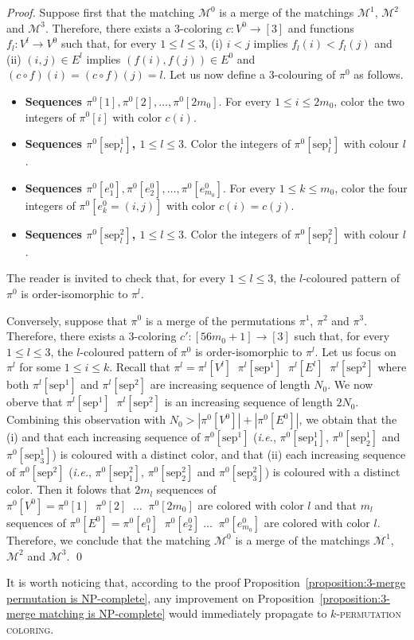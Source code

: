 \begin{proof}
  Suppose first 
  that the matching $\mathcal{M}^0$ is a merge of the matchings
  $\mathcal{M}^1$, $\mathcal{M}^2$ and $\mathcal{M}^3$.
  Therefore, there exists a $3$-coloring $c : V^0 \to [3]$
  and functions $f_l : V^l \to V^0$ such that, for every $1 \leq l \leq 3$,
  (i) $i < j$ implies $f_l(i) < f_l(j)$ and  
  (ii) $(i, j) \in E^l$ implies $(f(i), f(j)) \in E^0$ and $(c \circ f)(i) = (c \circ f)(j) = l$.
  Let us now define a $3$-colouring of $\pi^0$ as follows.
  \begin{itemize}
    \item \textbf{Sequences $\pi^0[1], \pi^0[2], \dots, \pi^0[2m_0]$}.
    For every $1 \leq i \leq 2m_0$, color the two integers of $\pi^0[i]$ with color $c(i)$.
    \item \textbf{Sequences $\pi^0[\text{sep}^{1}_{l}]$, $1 \leq l \leq 3$}.
    Color the integers of $\pi^0[\text{sep}^{1}_{l}]$ with colour $l$.
    \item \textbf{Sequences $\pi^0[e^0_1], \pi^0[e^0_2], \dots, \pi^0[e^0_{m_0}]$}.
    For every $1 \leq k \leq m_0$, color the four integers of $\pi^0[e^0_k = (i, j)]$ with color $c(i) = c(j)$.
    \item \textbf{Sequences $\pi^0[\text{sep}^{2}_{l}]$, $1 \leq l \leq 3$}.
    Color the integers of $\pi^0[\text{sep}^{2}_{l}]$ with colour $l$.
  \end{itemize}
  The reader is invited to check that, for every $1 \leq l \leq 3$,
  the $l$-coloured pattern of $\pi^0$ is order-isomorphic to $\pi^l$.

  Conversely, suppose that 
  $\pi^0$ is a merge of the permutations $\pi^1$, $\pi^2$ and $\pi^3$.
  Therefore, there exists a $3$-coloring $c': [56m_0 + 1] \to [3]$
  such that, for every $1 \leq l \leq 3$,
  the $l$-coloured pattern of $\pi^0$ is order-isomorphic to $\pi^l$.
  Let us focus on $\pi^l$ for some $1 \leq i \leq k$.
  Recall that
  $\pi^l = \pi^l[V^l] \;\; \pi^l[\text{sep}^{1}] \;\; \pi^l[E^l] \;\; \pi^l[\text{sep}^{2}]$
  where both
  $\pi^l[\text{sep}^{1}]$ and $\pi^l[\text{sep}^{2}]$
  are increasing sequence of length $N_0$.
  We now oberve that
  $\pi^l[\text{sep}^{1}] \;\; \pi^l[\text{sep}^{2}]$ is an increasing sequence of length $2N_0$.
  Combining this observation with  
  $N_0 > |\pi^0[V^0]| + |\pi^0[E^0]|$,
  we obtain that the 
  (i)  and that each increasing sequence of $\pi^0[\text{sep}^{1}]$
  (\emph{i.e.}, $\pi^0[\text{sep}^{1}_{1}]$, $\pi^0[\text{sep}^{1}_{2}]$ and $\pi^0[\text{sep}^{1}_{3}]$)
  is coloured with a distinct color, and that
  (ii) each increasing sequence of $\pi^0[\text{sep}^{2}]$
  (\emph{i.e.}, $\pi^0[\text{sep}^{2}_{1}]$, $\pi^0[\text{sep}^{2}_{2}]$ and $\pi^0[\text{sep}^{2}_{3}]$)
  is coloured with a distinct color.
  Then it folows that 
  $2m_l$ sequences of $\pi^0[V^0] = \pi^0[1] \;\; \pi^0[2] \;\; \dots \;\; \pi^0[2m_0]$ are colored with color $l$ 
  and that 
  $m_l$ sequences of $\pi^0[E^0] = \pi^0[e^0_1] \;\; \pi^0[e^0_2] \; \dots \;\; \pi^0[e^0_{m_0}]$
  are colored with color $l$.
  Therefore, 
  we conclude that the matching $\mathcal{M}^0$ is a merge 
  of the matchings $\mathcal{M}^1$, $\mathcal{M}^2$ and $\mathcal{M}^3$.
  \qed
\end{proof}

It is worth noticing that, according to the proof
Proposition~\ref{proposition:3-merge permutation is NP-complete},
any improvement on Proposition~\ref{proposition:3-merge matching is NP-complete}
would immediately propagate to \textsc{$k$-permutation coloring}.
